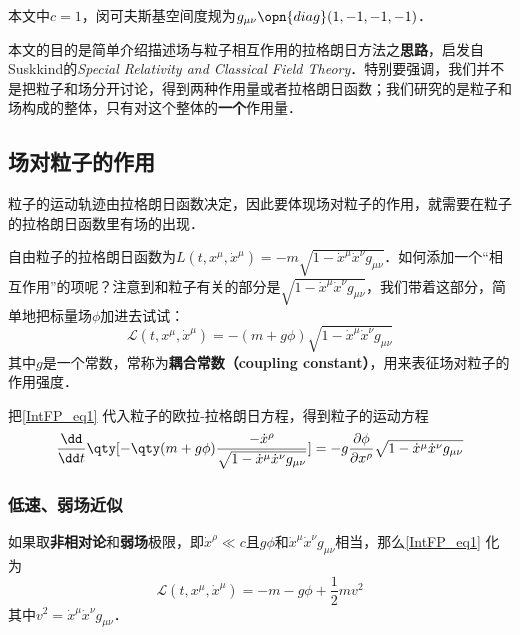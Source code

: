 

本文中$c=1$，闵可夫斯基空间度规为$g_{\mu\nu}\opn{diag}(1, -1, -1, -1)$．

本文的目的是简单介绍描述场与粒子相互作用的拉格朗日方法之\textbf{思路}，启发自Suskkind的\textsl{Special Relativity and Classical Field Theory}\cite{SusskindClassicalFields}．特别要强调，我们并不是把粒子和场分开讨论，得到两种作用量或者拉格朗日函数；我们研究的是粒子和场构成的整体，只有对这个整体的\textbf{一个}作用量．

\subsection{场对粒子的作用}

粒子的运动轨迹由拉格朗日函数决定，因此要体现场对粒子的作用，就需要在粒子的拉格朗日函数里有场的出现．

自由粒子的拉格朗日函数为$L(t, x^\mu, \dot{x}^\mu ) = -m\sqrt{1-\dot{x}^\mu \dot{x}^\nu g_{\mu\nu}}$．如何添加一个“相互作用”的项呢？注意到和粒子有关的部分是$\sqrt{1-\dot{x}^\mu \dot{x}^\nu g_{\mu\nu}}$，我们带着这部分，简单地把标量场$\phi$加进去试试：
\begin{equation}\label{IntFP_eq1}
\mathcal{L}(t, x^\mu, \dot{x}^\mu ) = -(m+g\phi)\sqrt{1-\dot{x}^\mu \dot{x}^\nu g_{\mu\nu}}
\end{equation}
其中$g$是一个常数，常称为\textbf{耦合常数（coupling constant）}，用来表征场对粒子的作用强度．

把\autoref{IntFP_eq1} 代入粒子的欧拉-拉格朗日方程，得到粒子的运动方程
\begin{equation}\label{IntFP_eq2}
\frac{\dd }{\dd t} \qty[-\qty(m+g\phi)\frac{-\dot{x}^\rho}{\sqrt{1-\dot{x}^\mu \dot{x}^\nu g_{\mu\nu}}}] = -g\frac{\partial \phi}{\partial x^\rho}\sqrt{1-\dot{x}^\mu \dot{x}^\nu g_{\mu\nu}}
\end{equation}


\subsubsection{低速、弱场近似}

如果取\textbf{非相对论}和\textbf{弱场}极限，即$\dot{x}^\rho\ll c$且$g\phi$和$\dot{x}^\mu \dot{x}^\nu g_{\mu\nu}$相当，那么\autoref{IntFP_eq1} 化为
\begin{equation}\label{IntFP_eq3}
\mathcal{L}(t, x^\mu, \dot{x}^\mu ) = -m-g\phi+\frac{1}{2}mv^2
\end{equation}
其中$v^2=\dot{x}^\mu \dot{x}^\nu g_{\mu\nu}$．

